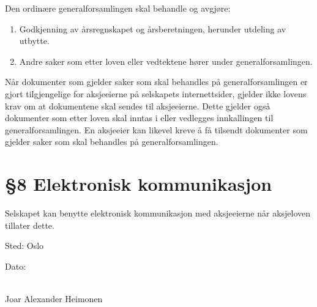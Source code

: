 \documentclass[12pt,a4paper]{article}
\begin{document}
Den ordinære generalforsamlingen skal behandle og avgjøre:

\begin{enumerate}
    \item Godkjenning av årsregnskapet og årsberetningen, herunder utdeling av utbytte.
    \item Andre saker som etter loven eller vedtektene hører under generalforsamlingen.
\end{enumerate}
Når dokumenter som gjelder saker som skal behandles på generalforsamlingen er gjort tilgjengelige for aksjeeierne på selskapets internettsider, gjelder ikke lovens krav om at dokumentene skal sendes til aksjeeierne. Dette gjelder også dokumenter som etter loven skal inntas i eller vedlegges innkallingen til generalforsamlingen. En aksjeeier kan likevel kreve å få tilsendt dokumenter som gjelder saker som skal behandles på generalforsamlingen.

\section*{\S 8 Elektronisk kommunikasjon}

Selskapet kan benytte elektronisk kommunikasjon med aksjeeierne når aksjeloven tillater dette.

\vspace{2cm}

\noindent
Sted: Oslo

\vspace{0.5cm}

\noindent
Dato: \underline{\hspace{4cm}}

\vspace{1.5cm}

\noindent
\underline{\hspace{7cm}} \\
Joar Alexander Heimonen
\end{document}
